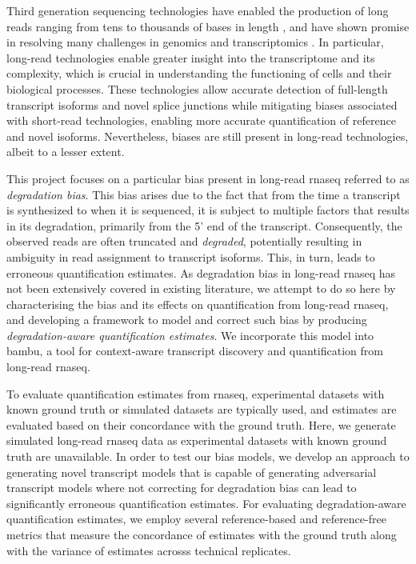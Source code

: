 Third generation sequencing technologies have enabled the production of long reads ranging from tens to thousands of bases in length \cite{Pollard2018}, and have shown promise in resolving many challenges in genomics and transcriptomics \cite{Bolisetty2015, Byrne2017, DeCoster2019, Liu2019, Mantere2019, Nurk2021}. In particular, long-read technologies enable greater insight into the transcriptome and its complexity, which is crucial in understanding the functioning of cells and their biological processes. These technologies allow accurate detection of full-length transcript isoforms and novel splice junctions while mitigating biases associated with short-read technologies, enabling more accurate quantification of reference and novel isoforms. Nevertheless, biases are still present in long-read technologies, albeit to a lesser extent. 

This project focuses on a particular bias present in long-read \gls{rnaseq} referred to as \textit{degradation bias}. This bias arises due to the fact that from the time a transcript is synthesized to when it is sequenced, it is subject to multiple factors that results in its degradation, primarily from the 5' end of the transcript. Consequently, the observed reads are often truncated and \textit{degraded}, potentially resulting in ambiguity in read assignment to transcript isoforms. This, in turn, leads to erroneous quantification estimates. As degradation bias in long-read \gls{rnaseq} has not been extensively covered in existing literature, we attempt to do so here by characterising the bias and its effects on quantification from long-read \gls{rnaseq}, and developing a framework to model and correct such bias by producing \textit{degradation-aware quantification estimates}. We incorporate this model into bambu, a tool for context-aware transcript discovery and quantification from long-read \gls{rnaseq}. 

To evaluate quantification estimates from \gls{rnaseq}, experimental datasets with known ground truth or simulated datasets are typically used, and estimates are evaluated based on their concordance with the ground truth. Here, we generate simulated long-read \gls{rnaseq} data as experimental datasets with known ground truth are unavailable. In order to test our bias models, we develop an approach to generating novel transcript models that is capable of generating adversarial transcript models where not correcting for degradation bias can lead to significantly erroneous quantification estimates. For evaluating degradation-aware quantification estimates, we employ several reference-based and reference-free metrics that measure the concordance of estimates with the ground truth along with the variance of estimates acrosss technical replicates.   

